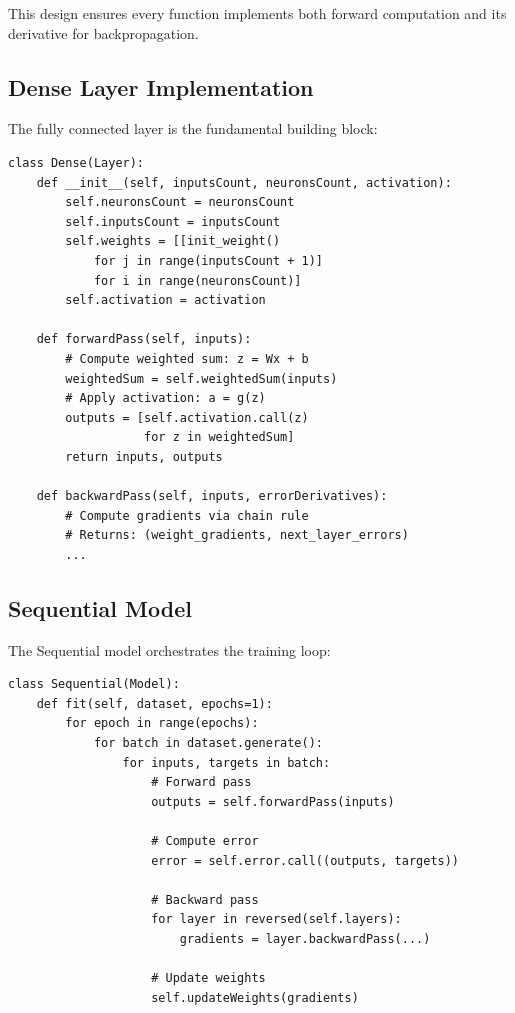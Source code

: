 \documentclass[12pt,a4paper]{article}
\begin{document}
This design ensures every function implements both forward computation and its derivative for backpropagation.

\subsection{Dense Layer Implementation}

The fully connected layer is the fundamental building block:

\begin{lstlisting}[caption={Key methods of the Dense layer (simplified)}]
class Dense(Layer):
    def __init__(self, inputsCount, neuronsCount, activation):
        self.neuronsCount = neuronsCount
        self.inputsCount = inputsCount
        self.weights = [[init_weight() 
            for j in range(inputsCount + 1)] 
            for i in range(neuronsCount)]
        self.activation = activation
    
    def forwardPass(self, inputs):
        # Compute weighted sum: z = Wx + b
        weightedSum = self.weightedSum(inputs)
        # Apply activation: a = g(z)
        outputs = [self.activation.call(z) 
                   for z in weightedSum]
        return inputs, outputs
    
    def backwardPass(self, inputs, errorDerivatives):
        # Compute gradients via chain rule
        # Returns: (weight_gradients, next_layer_errors)
        ...
\end{lstlisting}

\subsection{Sequential Model}

The Sequential model orchestrates the training loop:

\begin{lstlisting}[caption={Sequential model training (core structure)}]
class Sequential(Model):
    def fit(self, dataset, epochs=1):
        for epoch in range(epochs):
            for batch in dataset.generate():
                for inputs, targets in batch:
                    # Forward pass
                    outputs = self.forwardPass(inputs)
                    
                    # Compute error
                    error = self.error.call((outputs, targets))
                    
                    # Backward pass
                    for layer in reversed(self.layers):
                        gradients = layer.backwardPass(...)
                        
                    # Update weights
                    self.updateWeights(gradients)
\end{lstlisting}
\end{document}
